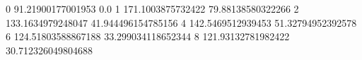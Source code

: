 0 91.21900177001953 0.0
1 171.1003875732422 79.88138580322266
2 133.1634979248047 41.944496154785156
4 142.5469512939453 51.32794952392578
6 124.51803588867188 33.299034118652344
8 121.93132781982422 30.712326049804688
